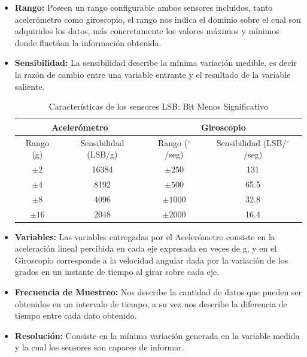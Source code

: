 \documentclass[12pt,a4paper]{article}
\newcommand{\grad}{$^{\circ}$}
\begin{document}
\begin{itemize}
	
	\item \textbf{Rango:} Poseen un rango configurable ambos sensores incluidos, tanto acelerómetro como giroscopio, el rango nos indica el dominio sobre el cual son adquiridos los datos, más concretamente los valores máximos y mínimos donde fluctúan la información obtenida.
	
	\item \textbf{Sensibilidad:} La sensibilidad describe la mínima variación medible, es decir la razón de cambio entre una variable entrante y el resultado de la variable saliente.
	
	\begin{table}[H]
		\centering
		\begin{tabular}{|c|c|c|c|}
			\hline
			\multicolumn{2}{|c|}{Acelerómetro} &\multicolumn{2}{|c|}{Giroscopio}   \\
			\hline
			Rango (g)        & Sensibilidad (LSB/g)  & Rango (\grad/seg)     & Sensibilidad (LSB/\grad/seg)\\ \hline
			$\pm 2$     &  16384 & $\pm 250 $  	& 	131      	\\ 
			$\pm 4$     &  8192  & $\pm 500 $ 	& 	65.5     	\\
			$\pm 8$     &  4096  & $\pm 1000$  	& 	32.8       	\\
			$\pm 16$    &  2048  & $\pm 2000$   & 	16.4      	\\ 
			\hline
		\end{tabular}
		\caption{Características de los sensores LSB: Bit Menos Significativo}
		\label{table:caracteristicasSensor}
	\end{table}
	
	\item \textbf{Variables:} Las variables entregadas por el Acelerómetro consiste en la aceleración lineal percibida en cada eje expresada en veces de g, y en el Giroscopio corresponde  a la velocidad angular dada por la variación de los grados en un instante de tiempo al girar sobre cada eje.
	
	\item \textbf{Frecuencia de Muestreo:} Nos describe la cantidad de datos que pueden ser obtenidos en un intervalo de tiempo, a su vez nos describe la diferencia de tiempo entre cada dato obtenido.
	
	\item \textbf{Resolución:} Consiste en la mínima variación generada en la variable medida y la cual los sensores son capaces de informar.
	

\end{itemize}
\end{document}
